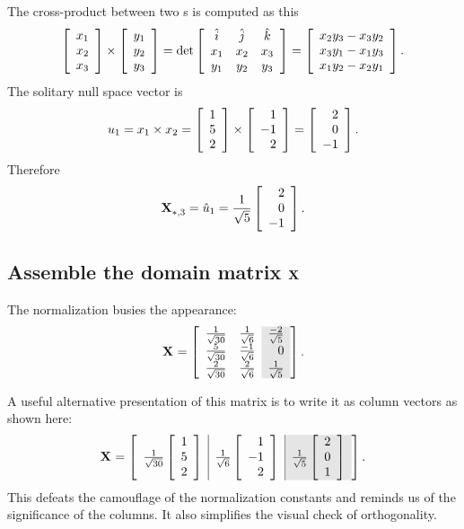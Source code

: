 The cross-product between two \vvv s is computed as this
\begin{equation}
\mat{c}{x_{1}\\x_{2}\\x_{3}}
\times
\mat{c}{y_{1}\\y_{2}\\y_{3}}
=
\det
\mat{ccc}
{
\hat{i} & \hat{j} & \hat{k} \\
  x_{1} & x_{2}   & x_{3}   \\
  y_{1} & y_{2}   & y_{3}   \\
}
=
\mat{c}
{
x_{2}y_{3}-x_{3}y_{2} \\
x_{3}y_{1}-x_{1}y_{3} \\
x_{1}y_{2}-x_{2}y_{1} 
}.
\end{equation}
The solitary null space vector is
\begin{equation}
u_{1} = x_{1} \times x_{2} =
\mat{c}{1\\5\\2}
\times
\mat{r}{1\\-1\\2}
=
\mat{r}
{
 2 \\
 0 \\
-1 
}.
\end{equation}
Therefore
\begin{equation}
  \X{}_{*,3} =\hat{u}_{1} = \frac{1}{\sqrt{5}}
\mat{r}
{
 2 \\
 0 \\
-1 
}.
\end{equation}

\subsection{Assemble the domain matrix $\X{}$}
The normalization busies the appearance:
\begin{equation}
  \X{} = 
\left[
\begin{array}{ cr >{\columncolor{ltgray}}r }
  \frac{1}{\sqrt{30}} & \frac{ 1}{\sqrt{6}} & \frac{-2}{\sqrt{5}}\\
  \frac{5}{\sqrt{30}} & \frac{-1}{\sqrt{6}} & 0 \\
  \frac{2}{\sqrt{30}} & \frac{ 2}{\sqrt{6}} & \frac{ 1}{\sqrt{5}}\\
\end{array}
\right].
\end{equation}

A useful alternative presentation of this matrix is to write it as column vectors as shown here:
\begin{equation}
\X{}=
  \mat{c|c|>{\columncolor{ltgray}}c}
  {
  \frac{1}{\sqrt{30}} \mat{r}{1\\5\\2} &
  \frac{1}{\sqrt{6}}  \mat{r}{1\\-1\\2} &
  \frac{1}{\sqrt{5}}  \mat{r}{2\\0\\1}
  }.
\end{equation}
This defeats the camouflage of the normalization constants and reminds us of the significance of the columns. It also simplifies the visual check of orthogonality.

